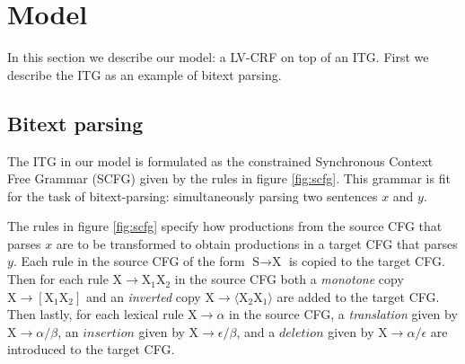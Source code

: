 \documentclass[11pt,a4paper]{article}
\begin{document}
\section{Model}

In this section we describe our model: a LV-CRF on top of an ITG. First we describe the ITG as an example of bitext parsing.

\subsection{Bitext parsing}

The ITG in our model is formulated as the constrained Synchronous Context Free Grammar (SCFG) given by the rules in figure \ref{fig:scfg}. This grammar is fit for the task of bitext-parsing: simultaneously parsing two sentences $x$ and $y$. 

The rules in figure \ref{fig:scfg} specify how productions from the source CFG that parses $x$ are to be transformed to obtain productions in a target CFG that parses $y$. Each rule in the source CFG of the form $\text{S} \to \text{X}$ is copied to the target CFG. Then for each rule $\text{X} \to \text{X}_1 \text{X}_2$ in the source CFG both a \textit{monotone} copy $\text{X} \to [\text{X}_1 \text{X}_2]$ and an \textit{inverted} copy $\text{X} \to \langle\text{X}_2 \text{X}_1\rangle$ are added to the target CFG. Then lastly, for each lexical rule $\text{X} \to \alpha$ in the source CFG, a \textit{translation} given by $\text{X} \to \alpha/\beta$, an $insertion$ given by $\text{X} \to \epsilon/\beta$, and a $deletion$ given by $\text{X} \to \alpha/\epsilon$ are introduced to the target CFG.
\end{document}

